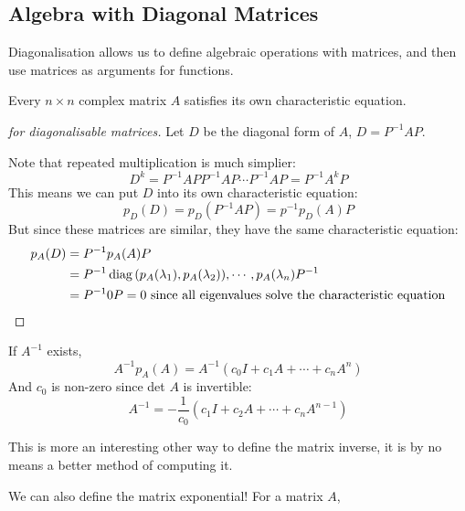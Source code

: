 \documentclass[../Main.tex]{subfiles}
\begin{document}
\subsection{Algebra with Diagonal Matrices}
Diagonalisation allows us to define algebraic operations with matrices, and then use matrices as arguments for functions.
\begin{theorem}
    Every $n \times n$ complex matrix $A$ satisfies its own characteristic equation.
\end{theorem}
\begin{proof}[for diagonalisable matrices]
    Let $D$ be the diagonal form of $A$, $D = P^{-1} A P$.\par
    Note that repeated multiplication is much simplier:
    \begin{equation*}
        D^k = P^{-1} A P P^{-1} A P \cdots P^{-1} A P = P^{-1} A^k P
    \end{equation*}
    This means we can put $D$ into its own characteristic equation:
    \begin{equation*}
        p_D(D) = p_D(P^{-1} A P) = p^{-1} p_D(A) P
    \end{equation*}
    But since these matrices are similar, they have the same characteristic equation:
    \begin{align*}
        p_A(D) &= P^{-1} p_A(A) P \\
        &= P^{-1} \operatorname{diag}{(p_A(\lambda_1), p_A(\lambda_2)), \cdots, p_A(\lambda_n)} P^{-1}  \\
        &= P^{-1} 0 P = 0 \text{ since all eigenvalues solve the characteristic equation}
    \end{align*}
\end{proof}
\begin{corollary}
    If $A^{-1}$ exists,
    \begin{equation*}
        A^{-1} p_A(A) = A^{-1} (c_0 I + c_1 A + \cdots + c_n A^n)
    \end{equation*}
    And $c_0$ is non-zero since det $A$ is invertible:
    \begin{equation*}
        A^{-1} = -\frac{1}{c_0} \left(c_1 I + c_2 A + \cdots + c_n A^{n-1}\right)
    \end{equation*}
\end{corollary}
\begin{remark}
    This is more an interesting other way to define the matrix inverse, it is by no means a better method of computing it.
\end{remark}
We can also define the matrix exponential! For a matrix $A$,
\end{document}
